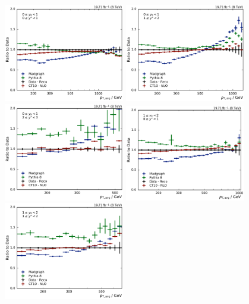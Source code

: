 \begin{figure}[htbp]
    \centering
    \includegraphics[width=0.47\textwidth]{figures/measurement/ratio_reco_to_data_yb0ys0.pdf}\hfill
    \includegraphics[width=0.47\textwidth]{figures/measurement/ratio_reco_to_data_yb0ys1.pdf}
    \includegraphics[width=0.47\textwidth]{figures/measurement/ratio_reco_to_data_yb0ys2.pdf}\hfill
    \includegraphics[width=0.47\textwidth]{figures/measurement/ratio_reco_to_data_yb1ys0.pdf}
    \includegraphics[width=0.47\textwidth]{figures/measurement/ratio_reco_to_data_yb1ys1.pdf}\hfill

\end{figure}
